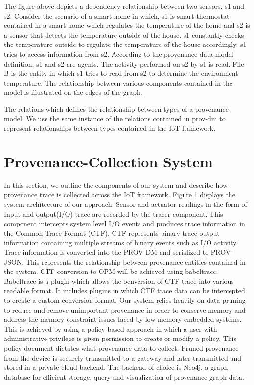 The figure above depicts a dependency relationship between two sensors, s1 and s2. Consider the scenario of a smart home in which, s1 is smart thermostat contained in a smart home which regulates the temperature of the home and s2 is a sensor that detects the temperature outside of the house. s1 constantly checks the temperature outside to regulate the temperature of the house accordingly. s1 tries to access information from s2. According to the provenance data model  definition, s1 and s2 are agents. The activity performed on s2 by s1 is read. File B is the entity in which s1 tries to read from s2 to determine the environment temperature. The relationship between various components contained in the model is illustrated on the edges of the graph.

\par The relations which defines the relationship between types of a provenance model. We use the same instance of the relations contained in prov-dm to represent relationships between types contained in the IoT framework.


\section{Provenance-Collection System}

In this section, we outline the components of our system and describe how provenance trace is collected across the IoT framework. Figure 1 displays the system architecture of our approach. Sensor and actuator readings in the form of Input and output(I/O) trace are recorded by the tracer component. This component intercepts system level I/O events and produces trace information in the Common Trace Format (CTF). CTF represents binary trace output information containing multiple streams of binary events such as I/O activity. Trace information is converted into the PROV-DM and serialized to PROV-JSON. This represents the relationship between provenance entities contained in the system. CTF conversion to OPM will be achieved using babeltrace. Babeltrace is a plugin which allows the ocnversion of CTF trace into various readable format. It includes plugins in which CTF trace data can be intercepted to create a custom conversion format. Our system relies heavily on data pruning to reduce and remove unimportant provenance in order to conserve memory and address the memory constraint issues faced by low memory embedded systems. This is achieved by using a policy-based approach in which a user with administrative privilege is given permission to create or modify a policy. This policy document dictates what provenance data to collect. Pruned provenance from the device is securely transmitted to a gateway and later transmitted and stored in a private cloud backend. The backend of choice is Neo4j, a graph database for efficient storage, query and visualization of provenance graph data.

